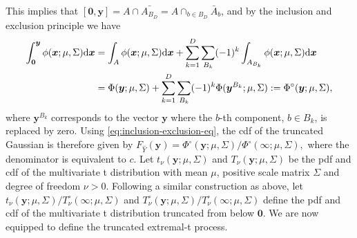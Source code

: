 \documentclass[12pt]{article}
\begin{document}
This implies that 
$[\bm 0,\bm y] = A \cap \bar{A_{B_D}} = A \cap_{b \in B_D} \bar{A}_b$, 
and by the inclusion and exclusion principle we have
%
\begin{align}
\int_{\bm 0}^{\bm y} \phi(\bm x;\mu,\Sigma) \text d \bm x &= \int_{A} \phi(\bm x;\mu,\Sigma) \text d \bm x + \sum_{k=1}^D \sum_{B_k}(-1)^k \int_{A_{B_k}} \phi(\bm x;\mu,\Sigma) \text d \bm x   \nonumber \\
&= \Phi(\bm y;\mu,\Sigma) + \sum_{k=1}^D \sum_{B_k}(-1)^k \Phi(\bm y^{B_k};\mu,\Sigma):= \Phi^\circ(\bm y;\mu,\Sigma)\label{eq:inclusion-exclusion-eq},
\end{align}
%
where $\bm y^{B_k}$ corresponds to the vector $\bm y$ where the $b$-th component, $b\in B_k$, is replaced by zero. Using \eqref{eq:inclusion-exclusion-eq}, the cdf of the truncated Gaussian is therefore given by
%
$
F_{\hat{Y}}(\bm y) = \Phi^\circ(\bm y;\mu,\Sigma) / \Phi^\circ(\bm \infty;\mu,\Sigma),
$
where the denominator is equivalent to $c$.
%
%
Let $t_\nu(\bm y; \mu, \Sigma)$ and $T_\nu(\bm y; \mu, \Sigma)$ be the pdf and cdf of the multivariate t distribution with mean $\mu$, positive scale matrix $\Sigma$ and degree of freedom $\nu>0$. Following a similar construction as above, let $t_\nu(\bm y; \mu, \Sigma) / T_{\nu}^\circ( \bm \infty;\mu,\Sigma)$ and $T_{\nu}^\circ( \bm y;\mu,\Sigma)/ T_{\nu}^\circ( \bm \infty;\mu,\Sigma)$ define the pdf and cdf of the multivariate t distribution truncated from below $\bm 0$. We are now equipped to define the truncated extremal-t process.
% 
\end{document}

